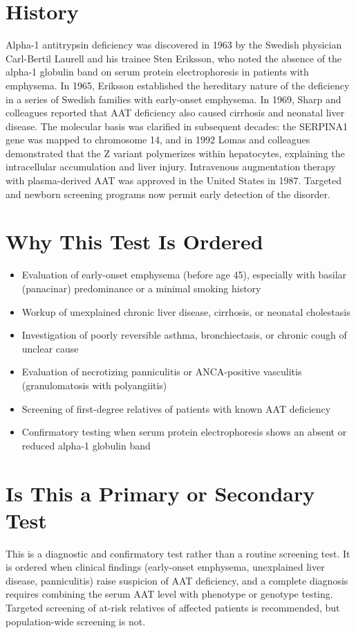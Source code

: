 \section*{History}
Alpha-1 antitrypsin deficiency was discovered in 1963 by the Swedish physician Carl-Bertil Laurell and his trainee Sten Eriksson, who noted the absence of the alpha-1 globulin band on serum protein electrophoresis in patients with emphysema. In 1965, Eriksson established the hereditary nature of the deficiency in a series of Swedish families with early-onset emphysema. In 1969, Sharp and colleagues reported that AAT deficiency also caused cirrhosis and neonatal liver disease. The molecular basis was clarified in subsequent decades: the SERPINA1 gene was mapped to chromosome 14, and in 1992 Lomas and colleagues demonstrated that the Z variant polymerizes within hepatocytes, explaining the intracellular accumulation and liver injury. Intravenous augmentation therapy with plasma-derived AAT was approved in the United States in 1987. Targeted and newborn screening programs now permit early detection of the disorder.
\section*{Why This Test Is Ordered}
\begin{itemize}
  \item Evaluation of early-onset emphysema (before age 45), especially with basilar (panacinar) predominance or a minimal smoking history
  \item Workup of unexplained chronic liver disease, cirrhosis, or neonatal cholestasis
  \item Investigation of poorly reversible asthma, bronchiectasis, or chronic cough of unclear cause
  \item Evaluation of necrotizing panniculitis or ANCA-positive vasculitis (granulomatosis with polyangiitis)
  \item Screening of first-degree relatives of patients with known AAT deficiency
  \item Confirmatory testing when serum protein electrophoresis shows an absent or reduced alpha-1 globulin band
\end{itemize}
\section*{Is This a Primary or Secondary Test}
This is a diagnostic and confirmatory test rather than a routine screening test. It is ordered when clinical findings (early-onset emphysema, unexplained liver disease, panniculitis) raise suspicion of AAT deficiency, and a complete diagnosis requires combining the serum AAT level with phenotype or genotype testing. Targeted screening of at-risk relatives of affected patients is recommended, but population-wide screening is not.
